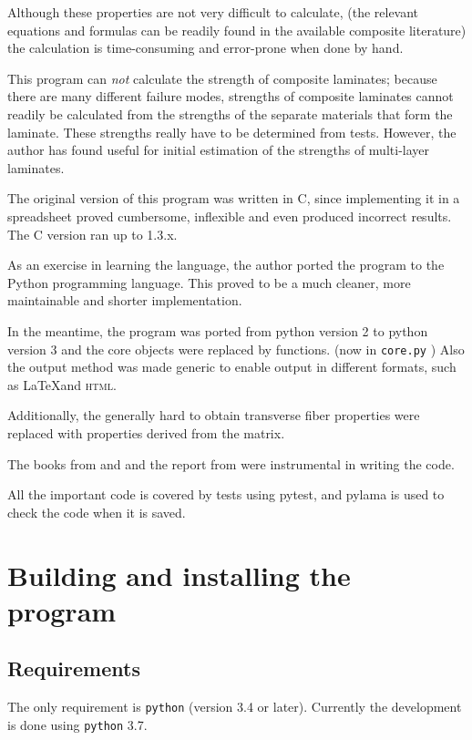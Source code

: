 \documentclass[a4paper,landscape,oneside,11pt,twocolumn]{memoir}
\begin{document}
Although these properties are not very difficult to calculate, (the relevant
equations and formulas can be readily found in the available composite
literature) the calculation is time-consuming and error-prone when done by
hand.

This program can \emph{not} calculate the strength of composite laminates;
because there are many different failure modes, strengths of composite
laminates cannot readily be calculated from the strengths of the separate
materials that form the laminate. These strengths really have to be determined from
tests. However, the author has found \citet{1992WeiEn..52...29H} useful for
initial estimation of the strengths of multi-layer laminates.

The original version of this program was written in C, since implementing
it in a spreadsheet proved cumbersome, inflexible and even produced
incorrect results. The C version ran up to 1.3.x.

As an exercise in learning the language, the author ported the program to
the Python programming language. This proved to be a much cleaner, more
maintainable and shorter implementation.

In the meantime, the program was ported from python version 2 to python
version 3 and the core objects were replaced by functions. (now in
\texttt{core.py} ) Also the output method was made generic to enable output in
different formats, such as \LaTeX and \textsc{html}.

Additionally, the generally hard to obtain transverse fiber properties
were replaced with properties derived from the matrix.

The books from \citet{Hyer:1998} and \citet{Tsai:1992} and the report from
\citet{Nettles:1994} were instrumental in writing the code.

All the important code is covered by tests using pytest, and pylama is used to
check the code when it is saved.

\chapter{Building and installing the program} %

\section{Requirements} %

The only requirement is \texttt{python} (version 3.4 or later). Currently the
development is done using \texttt{python} 3.7.
\end{document}
